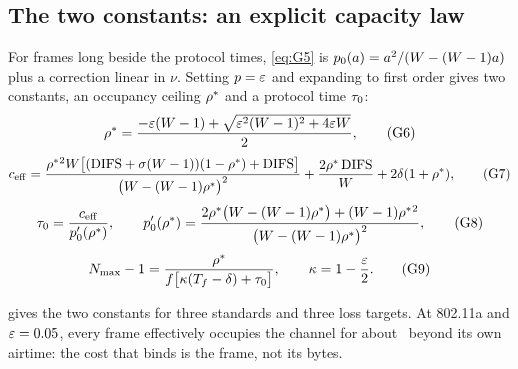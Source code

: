 \documentclass[11pt,a4paper]{article}
\begin{document}
\subsection{The two constants: an explicit capacity law}

For frames long beside the protocol times, \eqref{eq:G5} is $p_0(a)=a^2/(W-(W-1)a)$ plus a
correction linear in $\nu$. Setting $p=\varepsilon$ and expanding to first order gives two constants, an
occupancy ceiling $\rhostar$ and a protocol time $\tauzero$:
\begin{equation}
\rho^{\ast}=\frac{-\varepsilon(W-1)+\sqrt{\varepsilon^2(W-1)^2+4\varepsilon W}}{2}, \tag{G6}\label{eq:G6}
\end{equation}
\begin{equation}
c_{\mathrm{eff}}=\frac{\rho^{\ast}{}^2W\bigl[(\mathrm{DIFS}+\sigma(W-1))(1-\rho^{\ast})+\mathrm{DIFS}\bigr]}
{\bigl(W-(W-1)\rho^{\ast}\bigr)^2}+\frac{2\rho^{\ast}\,\mathrm{DIFS}}{W}+2\delta(1+\rho^{\ast}), \tag{G7}\label{eq:G7}
\end{equation}
\begin{equation}
\tau_0=\frac{c_{\mathrm{eff}}}{p_0'(\rho^{\ast})},\qquad
p_0'(\rho^{\ast})=\frac{2\rho^{\ast}\bigl(W-(W-1)\rho^{\ast}\bigr)+(W-1)\rho^{\ast}{}^2}
{\bigl(W-(W-1)\rho^{\ast}\bigr)^2}, \tag{G8}\label{eq:G8}
\end{equation}
\begin{equation}
N_{\max}-1=\frac{\rho^{\ast}}{f\bigl[\kappa(T_f-\delta)+\tau_0\bigr]},\qquad \kappa=1-\frac{\varepsilon}{2}. \tag{G9}\label{eq:G9}
\end{equation}

 gives the two constants for three standards and three loss targets. At
802.11a and $\varepsilon=0.05$, every frame effectively occupies the channel for about \kTauA\,\us{} beyond
its own airtime: the cost that binds is the frame, not its bytes.

\begin{table}[htbp]
\centering\small

\caption{The two constants $\rhostar$ / $\tauzero$ (\textmu s) of \eqref{eq:G6}--\eqref{eq:G8},
computed from each standard's slot, DIFS and window and ns-3's preamble-detection time $\delta$.
Nothing is fitted.}
\label{tab:constants}
\end{table}
\end{document}
